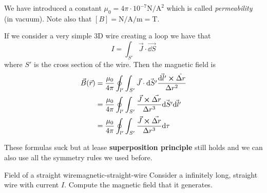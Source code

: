 \documentclass[12pt]{extarticle}
\begin{document}
We have introduced a constant $\mu_0 = 4 \pi \cdot 10^{-7} \si{\newton \per \ampere \squared}$
which is called \emph{permeability} (in vacuum).
Note also that $[B] = \si{\newton \per \ampere \per \meter} = \si{\tesla}$.

If we consider a very simple 3D wire creating a loop we have that
\begin{equation}
	I = \int_{S'} \vec J \cdot \vec{\dd S}
\end{equation}
where $S'$ is the cross section of the wire.
Then the magnetic field is
\begin{align}
	\vec B(\vec r) & = \frac{\mu_0}{4 \pi} \oint_{l'} \int_{S'} \vec J \cdot \vec{\dd S'} \frac{\vec{\dd l'} \cross \hat{\Delta r}}{\Delta r^2} \\
	               & = \frac{\mu_0}{4 \pi} \oint_{l'} \int_{S'} \frac{\vec J \cross \vec{\Delta r}}{\Delta r^3} \vec{\dd S'} \vec{\dd l'}       \\
	               & = \frac{\mu_0}{4 \pi} \oint_{l'} \int_{S'} \frac{\vec J \cross \vec{\Delta r}}{\Delta r^3} \dd \tau
\end{align}

These formulas suck but at lease \textbf{superposition principle} still holds
and we can also use all the symmetry rules we used before.

\begin{example}{Field of a straight wire}{magnetic-straight-wire}
	Consider a infinitely long, straight wire with current $I$.
	Compute the magnetic field that it generates.
\end{example}
\end{document}
